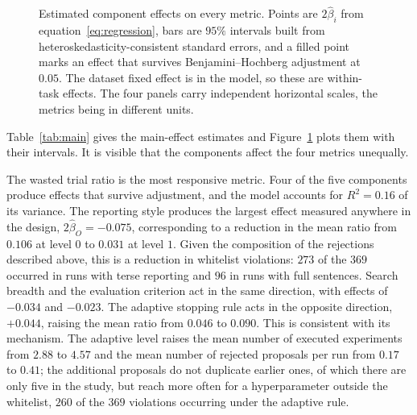 \documentclass[11pt]{article}
\begin{document}
\begin{figure}[t]
\caption{Estimated component effects on every metric. Points are $2\hat\beta_i$ from
equation~\eqref{eq:regression}, bars are $95\%$ intervals built from
heteroskedasticity-consistent standard errors, and a filled point marks an effect that
survives Benjamini--Hochberg adjustment at $0.05$. The dataset fixed effect is in the
model, so these are within-task effects. The four panels carry independent horizontal
scales, the metrics being in different units.}
\label{fig:coefficients}
\end{figure}

Table~\ref{tab:main} gives the main-effect estimates and Figure~\ref{fig:coefficients} plots them with their intervals. It is visible that the components affect the four metrics unequally.

The wasted trial ratio is the most responsive metric. Four of the five components produce effects that survive adjustment, and the model accounts for $R^2=0.16$ of its variance. The reporting style produces the largest effect measured anywhere in the design, $2\hat\beta_O=-0.075$, corresponding to a reduction in the mean ratio from $0.106$ at level $0$ to $0.031$ at level $1$. Given the composition of the rejections described above, this is a reduction in whitelist violations: $273$ of the $369$ occurred in runs with terse reporting and $96$ in runs with full sentences. Search breadth and the evaluation criterion act in the same direction, with effects of $-0.034$ and $-0.023$. The adaptive stopping rule acts in the opposite direction, $+0.044$, raising the mean ratio from $0.046$ to $0.090$. This is consistent with its mechanism. The adaptive level raises the mean number of executed experiments from $2.88$ to $4.57$ and the mean number of rejected proposals per run from $0.17$ to $0.41$; the additional proposals do not duplicate earlier ones, of which there are only five in the study, but reach more often for a hyperparameter outside the whitelist, $260$ of the $369$ violations occurring under the adaptive rule.
\end{document}
